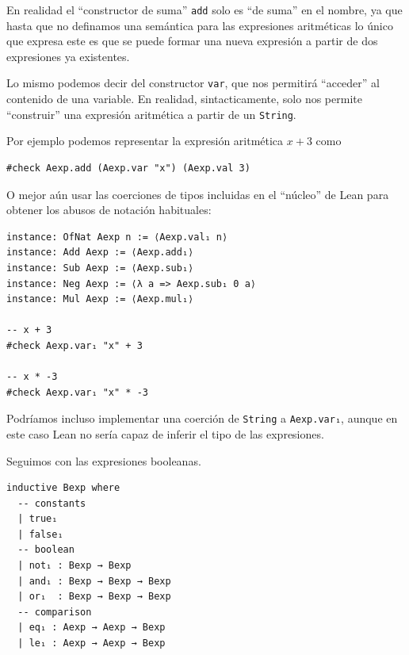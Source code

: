 \documentclass[../main.tex]{subfiles}
\begin{document}
En realidad el \enquote{constructor de suma} \texttt{add} solo es \enquote{de suma} en
el nombre, ya que hasta que no definamos una semántica para las expresiones
aritméticas lo único que expresa este es que se puede formar una
nueva expresión a partir de dos expresiones ya existentes.

Lo mismo podemos decir del constructor \texttt{var}, que nos permitirá
\enquote{acceder} al contenido de una variable. En realidad, sintacticamente,
solo nos permite \enquote{construir} una expresión aritmética a partir de un \texttt{String}.

Por ejemplo podemos representar la expresión aritmética \(x + 3\) como 
\begin{verbatim}
#check Aexp.add (Aexp.var "x") (Aexp.val 3)
\end{verbatim}

O mejor aún usar las coerciones de tipos incluidas en el \enquote{núcleo} de Lean para
obtener los abusos de notación habituales:

\begin{verbatim}
instance: OfNat Aexp n := ⟨Aexp.val₁ n⟩
instance: Add Aexp := ⟨Aexp.add₁⟩
instance: Sub Aexp := ⟨Aexp.sub₁⟩
instance: Neg Aexp := ⟨λ a => Aexp.sub₁ 0 a⟩
instance: Mul Aexp := ⟨Aexp.mul₁⟩

-- x + 3
#check Aexp.var₁ "x" + 3

-- x * -3
#check Aexp.var₁ "x" * -3
\end{verbatim}

Podríamos incluso implementar una coerción de \texttt{String} a \texttt{Aexp.var₁},
aunque en este caso Lean no sería capaz de inferir el tipo de las expresiones.

Seguimos con las expresiones booleanas.

\begin{verbatim}
inductive Bexp where
  -- constants
  | true₁
  | false₁
  -- boolean
  | not₁ : Bexp → Bexp
  | and₁ : Bexp → Bexp → Bexp
  | or₁  : Bexp → Bexp → Bexp
  -- comparison
  | eq₁ : Aexp → Aexp → Bexp
  | le₁ : Aexp → Aexp → Bexp
\end{verbatim}
\end{document}
